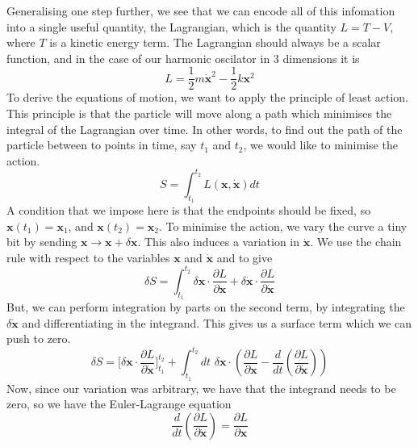 Generalising one step further, we see that we can encode all of this infomation into a single useful quantity, the Lagrangian, which is the quantity $L = T - V$, where $T$ is a kinetic energy term. The Lagrangian should always be a scalar function, and in the case of our harmonic oscilator in 3 dimensions it is \[ 
L = 	\frac{1 } {2} m \dot{ \mathbf{x}}^ 2 - \frac{1}{ 2} k \mathbf{x}^2 \]   
To derive the equations of motion, we want to apply the principle of least action. This principle is that the particle will move along a path which minimises the integral of the Lagrangian over time. In other words, to find out the path of the particle between to points in time, say $t_1$ and $t_2$, we would like to minimise the action.
\[ S = \int_{t_1}^ {t_2} L( \mathbf{ x} , \dot{\mathbf{x} } )   dt \] 
A condition that we impose here is that the endpoints should be fixed, so $\mathbf{x}( t_1 ) = \mathbf{ x} _1$, and $ \mathbf{x}( t_2 ) = \mathbf{x}_2 $.  
To minimise the action, we vary the curve a tiny bit by sending $\mathbf{x} \rightarrow \mathbf{x} + \delta \mathbf{ x} $. This also induces a variation in $\dot{\mathbf{x} } $. We use the chain rule with respect to the variables $\mathbf{x} $ and $\dot{\mathbf{x}} $ and to give \[ 
\delta S = \int_{ t_1}^{t_2} \delta \mathbf{x} \cdot \frac{ \partial L}{ \partial \mathbf{x} } + \delta \dot{\mathbf{x}}\cdot  \frac{ \partial L }{ \partial \dot{\mathbf{x}}} \] 
But, we can perform integration by parts on the second term, by integrating the $\delta \dot{\mathbf{x}} $ and differentiating in the integrand. This gives us a surface term which we can push to zero.
\[ \delta S = \big [ \delta \mathbf{ x} \cdot \frac{ \partial L } { \partial \dot{\mathbf{x}}}   \big ]^{t_2}_{t_1 }  + \int_{t_1}^{t_2} dt \, \, \delta \mathbf{x} \cdot \left( \frac{ \partial L }{ \partial \mathbf{x}} - \frac{d}{dt} \left( \frac{ \partial L }{\partial \dot{\mathbf{x}}} \right) \right)   \] 
Now, since our variation was arbitrary, we have that the integrand needs to be zero, so we have the Euler-Lagrange equation \[ \frac{ d} {dt } \left( \frac{ \partial L } { \partial \dot{ \mathbf{x}} } \right) = \frac{ \partial L }{ \partial \mathbf{x} } \] 

